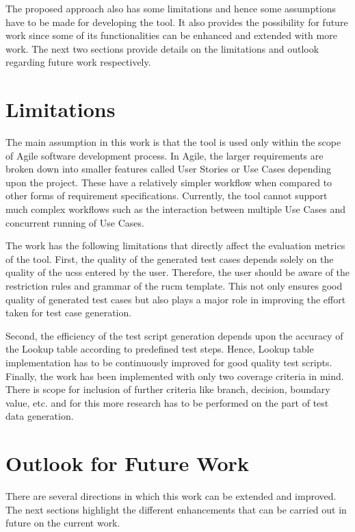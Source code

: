 The proposed approach also has some limitations and hence some assumptions have to be made for developing the tool. It also provides the possibility for future work since some of its functionalities can be enhanced and extended with more work. The next two sections provide details on the limitations and outlook regarding future work respectively.

 
\section{Limitations}
The main assumption in this work is that the tool is used only within the scope of Agile software development process. In Agile, the larger requirements are broken down into smaller features called User Stories or Use Cases depending upon the project. These have a relatively simpler workflow when compared to other forms of requirement specifications. Currently, the tool cannot support much complex workflows such as the interaction between multiple Use Cases and concurrent running of Use Cases.

The work has the following limitations that directly affect the evaluation metrics of the tool. First, the quality of the generated test cases depends solely on the quality of the \glspl{ucs} entered by the user. Therefore, the user should be aware of the restriction rules and grammar of the \gls{rucm} template. This not only ensures good quality of generated test cases but also plays a major role in improving the effort taken for test case generation.  

Second, the efficiency of the test script generation depends upon the accuracy of the Lookup table according to predefined test steps. Hence, Lookup table implementation has to be continuously improved for good quality test scripts. Finally, the work has been implemented with only two coverage criteria in mind. There is scope for inclusion of further criteria like branch, decision, boundary value, etc. and for this more research has to be performed on the part of test data generation.


\section{Outlook for Future Work}
There are several directions in which this work can be extended and improved. The next sections highlight the different enhancements that can be carried out in future on the current work.

